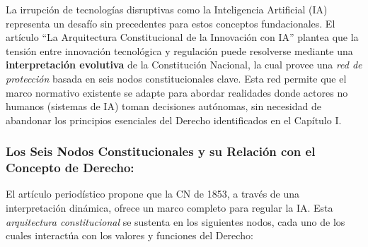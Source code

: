 \documentclass[10pt, a4paper]{article}
\begin{document}
La irrupción de tecnologías disruptivas como la Inteligencia Artificial (IA) representa un desafío sin precedentes para estos conceptos fundacionales. El artículo ``La Arquitectura Constitucional de la Innovación con IA'' \textcite{articulo_ia} plantea que la tensión entre innovación tecnológica y regulación puede resolverse mediante una \textbf{interpretación evolutiva} de la Constitución Nacional, la cual provee una \emph{red de protección} basada en seis nodos constitucionales clave. Esta red permite que el marco normativo existente se adapte para abordar realidades donde actores no humanos (sistemas de IA) toman decisiones autónomas, sin necesidad de abandonar los principios esenciales del Derecho identificados en el Capítulo I.

\subsubsection*{Los Seis Nodos Constitucionales y su Relación con el Concepto de Derecho:}
El artículo periodístico propone que la CN de 1853, a través de una interpretación dinámica, ofrece un marco completo para regular la IA. Esta \emph{arquitectura constitucional} se sustenta en los siguientes nodos, cada uno de los cuales interactúa con los valores y funciones del Derecho:
\end{document}
